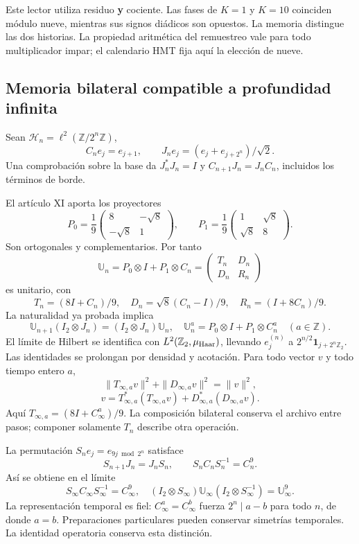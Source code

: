 Este lector utiliza residuo \textbf{y} cociente. Las fases de \(K=1\) y \(K=10\) coinciden módulo nueve, mientras sus signos diádicos son opuestos. La memoria distingue las dos historias. La propiedad aritmética del remuestreo vale para todo multiplicador impar; el calendario HMT fija aquí la elección de nueve.


\subsection{Memoria bilateral compatible a profundidad infinita}
\label{hmtfg:prolongacion:5}

Sean \(\mathcal H_n=\ell^2(\mathbb Z/2^n\mathbb Z)\),
\[
C_ne_j=e_{j+1},\qquad
J_ne_j=(e_j+e_{j+2^n})/\sqrt2.
\]
Una comprobación sobre la base da \(J_n^*J_n=I\) y \(C_{n+1}J_n=J_nC_n\), incluidos los términos de borde.

El artículo XI aporta los proyectores
\[
P_0=\frac19\begin{pmatrix}8&-\sqrt8\\-\sqrt8&1\end{pmatrix},\qquad
P_1=\frac19\begin{pmatrix}1&\sqrt8\\\sqrt8&8\end{pmatrix}.
\]
Son ortogonales y complementarios. Por tanto
\[
\mathbb U_n=P_0\otimes I+P_1\otimes C_n
=\begin{pmatrix}T_n&D_n\\D_n&R_n\end{pmatrix}
\]
es unitario, con
\[
T_n=(8I+C_n)/9,\quad D_n=\sqrt8(C_n-I)/9,\quad R_n=(I+8C_n)/9.
\]
La naturalidad ya probada implica
\[
\mathbb U_{n+1}(I_2\otimes J_n)=(I_2\otimes J_n)\mathbb U_n,
\quad \mathbb U_n^a=P_0\otimes I+P_1\otimes C_n^a
\quad(a\in\mathbb Z).
\]
El límite de Hilbert se identifica con \(L^2(\mathbb Z_2,\mu_{\rm Haar})\), llevando \(e_j^{(n)}\) a \(2^{n/2}\mathbf1_{j+2^n\mathbb Z_2}\). Las identidades se prolongan por densidad y acotación. Para todo vector \(v\) y todo tiempo entero \(a\),
\[
\boxed{\|T_{\infty,a}v\|^2+\|D_{\infty,a}v\|^2=\|v\|^2,}
\]
\[
\boxed{v=T_{\infty,a}^*(T_{\infty,a}v)+D_{\infty,a}^*(D_{\infty,a}v).}
\]
Aquí \(T_{\infty,a}=(8I+C_\infty^a)/9\). La composición bilateral conserva el archivo entre pasos; componer solamente \(T_n\) describe otra operación.

La permutación \(S_ne_j=e_{9j\bmod2^n}\) satisface
\[
S_{n+1}J_n=J_nS_n,\qquad S_nC_nS_n^{-1}=C_n^9.
\]
Así se obtiene en el límite
\[
S_\infty C_\infty S_\infty^{-1}=C_\infty^9,
\quad (I_2\otimes S_\infty)\mathbb U_\infty
(I_2\otimes S_\infty^{-1})=\mathbb U_\infty^9.
\]
La representación temporal es fiel: \(C_\infty^a=C_\infty^b\) fuerza \(2^n\mid a-b\) para todo \(n\), de donde \(a=b\). Preparaciones particulares pueden conservar simetrías temporales. La identidad operatoria conserva esta distinción.

